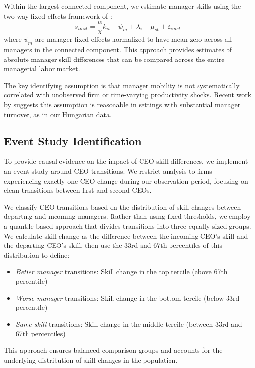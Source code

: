 \documentclass[11pt,a4paper]{article}
\begin{document}
Within the largest connected component, we estimate manager skills using the two-way fixed effects framework of \citet{abowd1999high}:
\begin{equation}
s_{imst} = \frac{\alpha}{\chi} k_{it} + \psi_m + \lambda_i + \mu_{st} + \varepsilon_{imst}
\end{equation}
where $\psi_m$ are manager fixed effects normalized to have mean zero across all managers in the connected component. This approach provides estimates of absolute manager skill differences that can be compared across the entire managerial labor market.

The key identifying assumption is that manager mobility is not systematically correlated with unobserved firm or time-varying productivity shocks. Recent work by \citet{metcalfe2023managers} suggests this assumption is reasonable in settings with substantial manager turnover, as in our Hungarian data.

\subsection{Event Study Identification}

To provide causal evidence on the impact of CEO skill differences, we implement an event study around CEO transitions. We restrict analysis to firms experiencing exactly one CEO change during our observation period, focusing on clean transitions between first and second CEOs.

We classify CEO transitions based on the distribution of skill changes between departing and incoming managers. Rather than using fixed thresholds, we employ a quantile-based approach that divides transitions into three equally-sized groups. We calculate skill change as the difference between the incoming CEO's skill and the departing CEO's skill, then use the 33rd and 67th percentiles of this distribution to define:
\begin{itemize}
\item \textit{Better manager} transitions: Skill change in the top tercile (above 67th percentile)
\item \textit{Worse manager} transitions: Skill change in the bottom tercile (below 33rd percentile)
\item \textit{Same skill} transitions: Skill change in the middle tercile (between 33rd and 67th percentiles)
\end{itemize}
This approach ensures balanced comparison groups and accounts for the underlying distribution of skill changes in the population.
\end{document}
